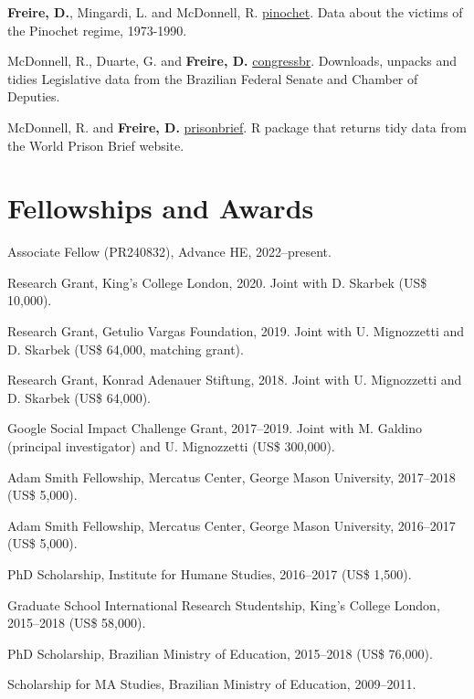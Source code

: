 \documentclass[a4paper]{article}
\renewenvironment{itemize}{
	\begin{list}{}{
			\setlength{\leftmargin}{1.5em}
		}
		}{
	\end{list}
}
\begin{document}
\begin{itemize}
\item \textbf{Freire, D.}, Mingardi, L. and McDonnell, R. \href{http://danilofreire.github.io/pinochet}{pinochet}. Data about the victims of the Pinochet regime, 1973-1990.
\item McDonnell, R., Duarte, G. and \textbf{Freire, D.} \href{https://github.com/RobertMyles/congressbr}{congressbr}. Downloads, unpacks and tidies Legislative data from the Brazilian Federal Senate and Chamber of Deputies.
\item McDonnell, R. and \textbf{Freire, D.} \href{http://danilofreire.github.io/prisonbrief}{prisonbrief}. R package that returns tidy data from the World Prison Brief website.
\end{itemize}

\section*{Fellowships and Awards}

\begin{itemize}
\item Associate Fellow (PR240832), Advance HE, 2022--present.
\item Research Grant, King's College London, 2020. Joint with D. Skarbek (US\$ 10,000).
\item Research Grant, Getulio Vargas Foundation, 2019. Joint with U. Mignozzetti and D. Skarbek (US\$ 64,000, matching grant).
\item Research Grant, Konrad Adenauer Stiftung, 2018. Joint with U. Mignozzetti and D. Skarbek (US\$ 64,000).
\item Google Social Impact Challenge Grant, 2017--2019. Joint with M. Galdino (principal investigator) and U. Mignozzetti (US\$ 300,000).
\item Adam Smith Fellowship, Mercatus Center, George Mason University, 2017--2018 (US\$ 5,000).
\item Adam Smith Fellowship, Mercatus Center, George Mason University, 2016--2017 (US\$ 5,000).
\item PhD Scholarship, Institute for Humane Studies, 2016--2017 (US\$ 1,500).
\item Graduate School International Research Studentship, King's College London, 2015--2018 (US\$ 58,000).
\item PhD Scholarship, Brazilian Ministry of Education, 2015--2018 (US\$ 76,000).
\item Scholarship for MA Studies, Brazilian Ministry of Education, 2009--2011.
\end{itemize}
\end{document}
